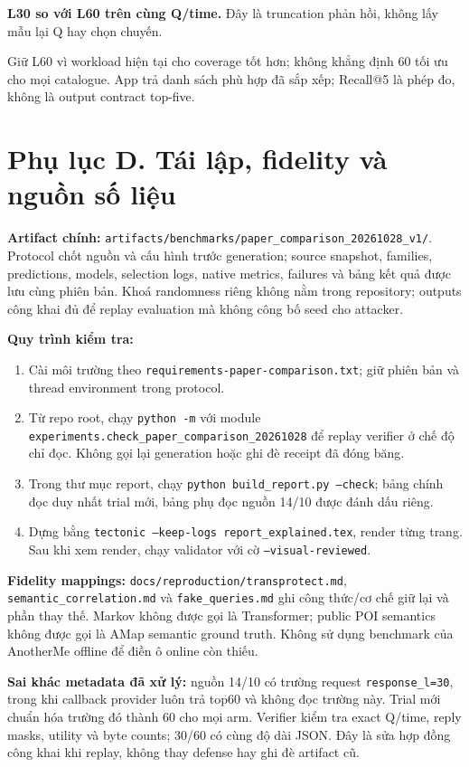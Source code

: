 \textbf{L30 so với L60 trên cùng Q/time.} Đây là truncation phản hồi, không lấy mẫu lại Q hay chọn chuyến.

Giữ L60 vì workload hiện tại cho coverage tốt hơn; không khẳng định 60 tối ưu cho mọi catalogue.
App trả danh sách phù hợp đã sắp xếp; Recall@5 là phép đo, không là output contract top-five.

\clearpage
\section*{Phụ lục D. Tái lập, fidelity và nguồn số liệu}
\textbf{Artifact chính:} \texttt{artifacts/benchmarks/paper\_comparison\_20261028\_v1/}.
Protocol chốt nguồn và cấu hình trước generation; source snapshot, families, predictions, models,
selection logs, native metrics, failures và bảng kết quả được lưu cùng phiên bản. Khoá randomness riêng
không nằm trong repository; outputs công khai đủ để replay evaluation mà không công bố seed cho attacker.

\textbf{Quy trình kiểm tra:}
\begin{enumerate}
\item Cài môi trường theo \texttt{requirements-paper-comparison.txt}; giữ phiên bản và thread environment trong protocol.
\item Từ repo root, chạy \texttt{python -m} với module
\texttt{experiments.check\_paper\_comparison\_20261028} để replay verifier ở chế độ chỉ đọc.
Không gọi lại generation hoặc ghi đè receipt đã đóng băng.
\item Trong thư mục report, chạy \texttt{python build\_report.py --check}; bảng chính đọc duy nhất trial mới,
bảng phụ đọc nguồn 14/10 được đánh dấu riêng.
\item Dựng bằng \texttt{tectonic --keep-logs report\_explained.tex}, render từng trang.
Sau khi xem render, chạy validator với cờ \texttt{--visual-reviewed}.
\end{enumerate}

\textbf{Fidelity mappings:} \texttt{docs/reproduction/transprotect.md},
\texttt{semantic\_correlation.md} và \texttt{fake\_queries.md} ghi công thức/cơ chế giữ lại và phần thay thế.
Markov không được gọi là Transformer; public POI semantics không được gọi là AMap semantic ground truth.
Không sử dụng benchmark của AnotherMe offline để điền ô online còn thiếu.

\textbf{Sai khác metadata đã xử lý:} nguồn 14/10 có trường request \texttt{response\_l=30}, trong khi callback
provider luôn trả top60 và không đọc trường này. Trial mới chuẩn hóa trường đó thành 60 cho mọi arm.
Verifier kiểm tra exact Q/time, reply masks, utility và byte counts; 30/60 có cùng độ dài JSON.
Đây là sửa hợp đồng công khai khi replay, không thay defense hay ghi đè artifact cũ.

